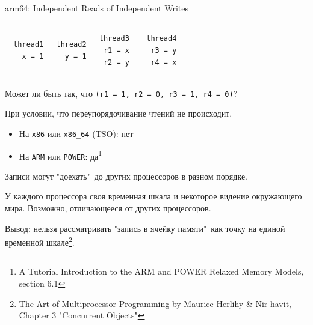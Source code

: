  
 \begin{frame}[fragile]{arm64: Independent Reads of Independent Writes}
 
 
 \begin{tabular}{p{} p{} p{} p{}}
 \begin{verbatim}
 thread1
   x = 1
 \end{verbatim}
 
 & 
 
 \begin{verbatim}
 thread2
   y = 1
 \end{verbatim}
 
 &
 
 \begin{verbatim}
 thread3
  r1 = x
  r2 = y 
 \end{verbatim}
 
 &
 
 \begin{verbatim}
 thread4
  r3 = y
  r4 = x
 \end{verbatim}
 \end{tabular}
 
 
 \pause
 Может ли быть так, что \texttt{(r1 = 1, r2 = 0, r3 = 1, r4 = 0)}?
 
 
 \pause
 При условии, что переупорядочивание чтений не происходит.
 
 \pause
 \begin{itemize}
 \item На \texttt{x86} или \texttt{x86\_64} (TSO): нет
 
 \pause
 \item На \texttt{ARM} или \texttt{POWER}: да\footnote<5->{\tiny A Tutorial Introduction to the ARM and POWER Relaxed Memory Models, section 6.1}
 \end{itemize}
 
 \pause
 Записи могут "доехать"\ до других процессоров в разном порядке.
 
 \pause
 У каждого процессора своя временная шкала и некоторое видение окружающего мира. Возможно, отличающееся от других процессоров.
 
 \pause
 Вывод: нельзя рассматривать "запись в ячейку памяти"\ как точку на единой временной шкале\footnote<8->{\tiny The Art of Multiprocessor Programming by Maurice Herlihy \& Nir havit, Chapter 3 "Concurrent Objects"}.



\end{frame}

